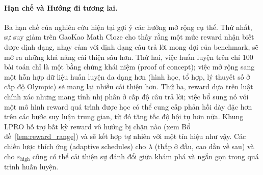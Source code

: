 \documentclass[11pt,a4paper]{article}
\begin{document}
\paragraph{Hạn chế và Hướng đi tương lai.} Ba hạn chế của nghiên cứu
hiện tại gợi ý các hướng mở rộng cụ thể. Thứ nhất, sự suy giảm trên GaoKao Math Cloze
cho thấy rằng một mức reward nhận biết được định dạng, nhạy cảm với định dạng câu trả lời mong đợi của
benchmark, sẽ mở ra những khả năng cải thiện sâu hơn. Thứ hai, việc huấn luyện trên chỉ 100 bài toán chỉ là một
bằng chứng khái niệm (proof of concept); việc mở rộng sang một hỗn hợp dữ liệu huấn luyện đa dạng hơn (hình học,
tổ hợp, lý thuyết số ở cấp độ Olympic) sẽ mang lại nhiều cải thiện hơn. Thứ ba,
reward dựa trên luật chính xác nhưng mang tính nhị phân ở cấp độ câu trả lời; việc bổ sung nó với một
mô hình reward quá trình được học có thể cung cấp phản hồi dày đặc hơn trên các bước suy luận
trung gian, từ đó tăng tốc độ hội tụ hơn nữa. Khung LPRO hỗ trợ bất kỳ
reward vô hướng bị chặn nào (xem Bổ đề~\ref{lem:reward_range}) và sẽ kết hợp tự nhiên với
một tín hiệu như vậy. Các chiến lược thích ứng
(adaptive schedules) cho \(\lambda\) (thấp ở đầu, cao dần về sau) và cho
\(\varepsilon_{\text{high}}\) cũng có thể cải thiện sự đánh đổi giữa khám phá và ngắn gọn
trong quá trình huấn luyện.
\end{document}
